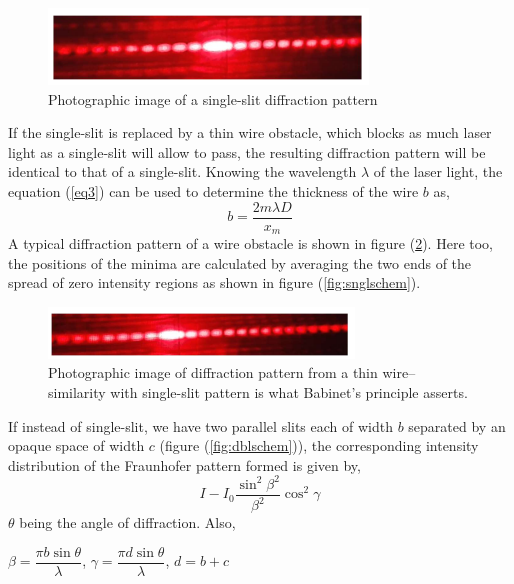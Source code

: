 \documentclass{article}
\begin{document}
\begin{figure}
    \centering
    \includegraphics{Figures/snglphoto.png}
    \captionsetup{justification=centering}
    \caption{Photographic image of a single-slit diffraction pattern}
    \label{fig:snglphoto}
\end{figure}
\par
\noindent
If the single-slit is replaced by a thin wire obstacle, which blocks as much laser light as a 
single-slit will allow to pass, the resulting diffraction pattern will be identical to that of a 
single-slit. Knowing the wavelength $\lambda$ of the laser light, the equation (\ref{eq3}) can be used to 
determine the thickness of the wire $b$ as,
\begin{equation}
\label{eq4}
    b = \dfrac{2 m \lambda D}{x_m}
\end{equation}
A typical diffraction pattern of a wire obstacle is shown in figure (\ref{fig:thinwire}). Here too, the positions of the minima are calculated by averaging the two ends of the spread of zero intensity regions as shown in figure (\ref{fig:snglschem}).
\begin{figure}[h!]
    \centering
    \includegraphics{Figures/thinwire.png}
    \captionsetup{justification=centering}
    \caption{Photographic image of diffraction pattern from a thin wire– similarity with single-slit pattern is what Babinet’s principle asserts.}
    \label{fig:thinwire}
\end{figure}
\par
\noindent
If instead of single-slit, we have two parallel slits each of width $b$ separated by an opaque space 
of width $c$ (figure (\ref{fig:dblschem})), the corresponding intensity distribution of the Fraunhofer pattern formed is given by, 
\begin{equation}
    I - I_0 \dfrac{\sin^2 \beta^2}{\beta^2} \cos^2 \gamma
\end{equation}
$\theta$ being the angle of diffraction. Also,
\begin{center}
    $\beta = \dfrac{\pi b \sin \theta}{\lambda}$, $\gamma = \dfrac{\pi d \sin \theta}{\lambda}$, $d = b + c$
\end{center}
\end{document}
